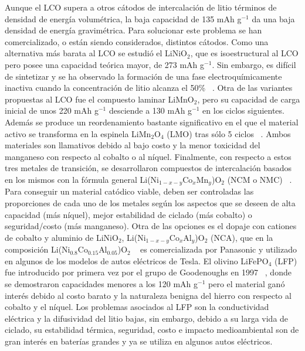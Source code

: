 Aunque el LCO supera a otros cátodos de intercalación de litio términos de 
densidad de energía volumétrica, la baja capacidad de 135 mAh g$^{-1}$ da una baja
densidad de energía gravimétrica. Para solucionar este problema se han 
comercializado, o están siendo considerados, distintos cátodos. Como una 
alternativa más barata al LCO se estudió el LiNiO$_2$, que es isoestructural al 
LCO pero posee una capacidad teórica mayor, de 273 mAh g$^{-1}$. Sin embargo,
es difícil de sintetizar y se ha observado la formación de una fase 
electroquímicamente inactiva cuando la concentración de litio alcanza el 50\% 
~\cite{ohzuku1993}. Otra de las variantes propuestas al LCO fue el compuesto 
laminar LiMnO$_2$, pero su capacidad de carga inicial de unos 220 mAh g$^{-1}$ 
desciende a 130 mAh g$^{-1}$ en los ciclos siguientes. Además se produce un 
reordenamiento bastante significativo en el que el material activo se transforma 
en la espinela LiMn$_2$O$_4$ (LMO) tras sólo 5 ciclos ~\cite{shao1999, shin2004}.
Ambos materiales son llamativos debido al bajo costo y la menor toxicidad del 
manganeso con respecto al cobalto o al níquel. Finalmente, con respecto a estos 
tres metales de transición, se desarrollaron compuestos de intercalación basados
en los mismos con la fórmula general Li(Ni$_{1-x-y}$Co$_x$Mn$_y$)O$_2$ (NCM o NMC)
~\cite{liu1999}. Para conseguir un material catódico viable, deben ser controladas
las proporciones de cada uno de los metales según los aspectos que se deseen de 
alta capacidad (más níquel), mejor estabilidad de ciclado (más cobalto) o 
seguridad/costo (más manganeso). Otra de las opciones es el dopaje con cationes
de cobalto y aluminio de LiNiO$_2$, Li(Ni$_{1-x-y}$Co$_x$Al$_y$)O$_2$ (NCA),
que en la composición Li(Ni$_{0.8}$Co$_{0.15}$Al$_{0.05}$)O$_2$ ~\cite{chen2004}
es comercializada por Panasonic y utilizado en algunos de los modelos de autos 
eléctricos de Tesla. El olivino LiFePO$_4$ (LFP) fue introducido por primera vez
por el grupo de Goodenoughs en 1997 ~\cite{padhi1997}, donde se demostraron 
capacidades menores a los 120 mAh g$^{-1}$ pero el material ganó interés debido
al costo barato y la naturaleza benigna del hierro con respecto al cobalto y el
níquel. Los problemas asociados al LFP son la conductividad eléctrica y la 
difusividad del litio bajas, sin embargo, debido a su larga vida de ciclado, su
estabilidad térmica, seguridad, costo e impacto medioambiental son de gran 
interés en baterías grandes y ya se utiliza en algunos autos eléctricos.

